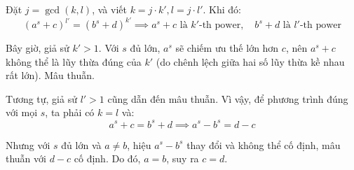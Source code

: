 \documentclass[../02-modular-arithmetic-b.tex]{subfiles}
\begin{document}
\begin{soln}
	
	Đặt \( j = \gcd(k, l) \), và viết \( k = j \cdot k', l = j \cdot l' \). Khi đó:
	\[
		(a^s + c)^{l'} = (b^s + d)^{k'}
		\implies a^s + c \text{ là } k'\text{-th power}, \quad b^s + d \text{ là } l'\text{-th power}
	\]
	
	Bây giờ, giả sử \( k' > 1 \). Với \( s \) đủ lớn, \( a^s \) sẽ chiếm ưu thế lớn hơn \( c \),
	nên \( a^s + c \) không thể là lũy thừa đúng của \( k' \) (do chênh lệch giữa hai số lũy thừa kề nhau rất lớn). Mâu thuẫn.
	
	Tương tự, giả sử \( l' > 1 \) cũng dẫn đến mâu thuẫn.
	Vì vậy, để phương trình đúng với mọi \( s \), ta phải có \( k = l \) và:
	\[
		a^s + c = b^s + d \implies a^s - b^s = d - c
	\]
	
	Nhưng với \( s \) đủ lớn và \( a \ne b \), hiệu \( a^s - b^s \) thay đổi và không thể cố định, mâu thuẫn với \( d - c \) cố định. Do đó, \( a = b \), suy ra \( c = d \).
\end{soln}

\end{document}
